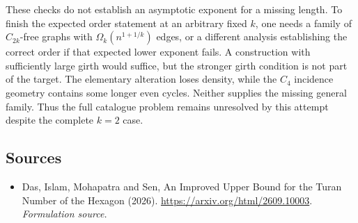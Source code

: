 \documentclass[11pt]{article}
\begin{document}
These checks do not establish an asymptotic exponent for a missing length. To finish the expected order statement at an arbitrary fixed $k$, one needs a family of $C_{2k}$-free graphs with $\Omega_k(n^{1+1/k})$ edges, or a different analysis establishing the correct order if that expected lower exponent fails. A construction with sufficiently large girth would suffice, but the stronger girth condition is not part of the target. The elementary alteration loses density, while the $C_4$ incidence geometry contains some longer even cycles. Neither supplies the missing general family. Thus the full catalogue problem remains unresolved by this attempt despite the complete $k=2$ case.

\subsection{Sources}
\begin{itemize}
\item[S1]Das, Islam, Mohapatra and Sen, An Improved Upper Bound for the Turan Number of the Hexagon (2026).
\url{https://arxiv.org/html/2609.10003}.
\textit{Formulation source.}
\end{itemize}
\end{document}
